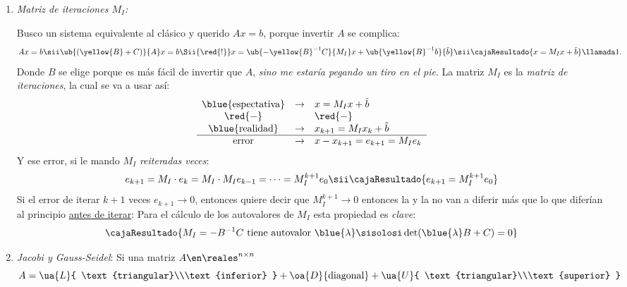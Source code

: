 \begin{enumerate}[label=\tiny\purple{\faIcon{snowman}}]
  \item \textit{Matriz de iteraciones $M_I$:}

        Busco un sistema equivalente al clásico y querido $A x= b$, porque invertir $A$ se complica:
        $$
          Ax = b
          \sii
          \ub{(\yellow{B} + C)}{A}x = b
          \Sii{\red{!}}
          x = \ub{-\yellow{B}^{-1}C}{M_I}x + \ub{\yellow{B}^{-1}b}{\tilde{b}}
          \sii
          \cajaResultado{
            x = M_Ix + \tilde{b}
          }\llamada1.
        $$
        Donde $B$ se elige porque es más fácil de invertir que $A$, \textit{sino me estaría pegando un tiro en el pie}.
        La matriz $M_I$ es la \textit{matriz de iteraciones}, la cual se va a usar así:
        $$
          \begin{array}{ccl}
            \text{\blue{espectativa}} & \to & x  = M_Ix + \tilde{b}           \\
            \red{-}                   &     & \red{-}                         \\
            \text{\blue{realidad}}    & \to & x_{k+1} = M_I x_k + \tilde{b}   \\ \hline
            \text{error}              & \to & x - x_{k+1} = e_{k+1} = M_I e_k
          \end{array}
        $$
        Y ese error, si le mando $M_I$ \textit{reiteradas veces}:
        $$
          e_{k+1} =M_I \cdot e_k =   M_I\cdot M_I e_{k-1}= \cdots = M_I^{k+1} e_0
          \sii
          \cajaResultado{
          e_{k+1} = M_I^{k+1} e_0
          }
        $$
        Si el error de iterar $k+1$ veces $e_{k+1} \to 0$, entonces
        quiere decir que $M_I^{k+1} \to 0$
        entonces la  y la  no van a diferir más que lo que diferían al principio \ul{antes de iterar}:
        \hypertarget{teoria-7:determinante}{Para} el cálculo de los autovalores de $M_I$ esta propiedad es \textit{clave}:
        $$
          \cajaResultado{
          M_I = -B^{-1} C \text{ tiene autovalor } \blue{\lambda}
          \sisolosi
          \det(\blue{\lambda} B + C ) = 0
          }
        $$

  \item \textit{Jacobi y Gauss-Seidel}:
        Si una matriz $A \en \reales^{n \times n}$
        $$
          A = \ua{L}{
            \text{triangular}\\\text{inferior}
          } +
          \oa{D}{
            \text{diagonal}
          } +
          \ua{U}{
            \text{triangular}\\\text{superior}
          }
        $$


\end{enumerate}
